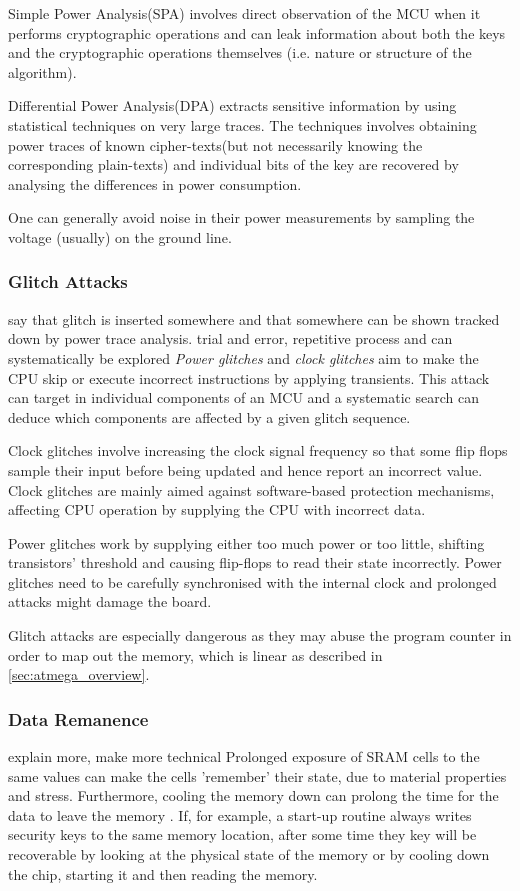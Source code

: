 	Simple Power Analysis(SPA) involves direct observation of the MCU when it performs cryptographic operations and can leak information about both the keys and the cryptographic operations themselves (i.e. nature or structure of the algorithm)\citep{kocher:DPA}\citep{anderson:tamper_resistance}. 

	Differential Power Analysis(DPA) extracts sensitive information by using statistical techniques on very large traces. The techniques involves obtaining power traces of known cipher-texts(but not necessarily knowing the corresponding plain-texts) and individual bits of the key are recovered by analysing the differences in power consumption\citep{kocher:DPA}\citep{anderson:tamper_resistance}.
	
	One can generally avoid noise in their power measurements by sampling the voltage (usually) on the ground line\citep{sergei:thesis}.
	\subsubsection{Glitch Attacks}
	{\color{red} say that glitch is inserted somewhere and that somewhere can be shown tracked down by power trace analysis. trial and error, repetitive process and can systematically be explored \citep{website:riscure}}
	\emph{Power glitches} and \emph{clock glitches} aim to make the CPU skip or execute incorrect instructions by applying transients. This attack can target in individual components of an MCU and a systematic search can deduce which components are affected by a given glitch sequence.
	
	Clock glitches involve increasing the clock signal frequency so that some flip flops sample their input before being updated and hence report an incorrect value. Clock glitches are mainly aimed against software-based protection mechanisms, affecting CPU operation by supplying the CPU with incorrect data.
	
	Power glitches work by supplying either too much power or too little, shifting transistors' threshold and causing flip-flops to read their state incorrectly. Power glitches need to be carefully synchronised with the internal clock and prolonged attacks might damage the board.
	
	Glitch attacks are especially dangerous as they may abuse the program counter in order to map out the memory, which is linear as described in \ref{sec:atmega_overview}.
	
	\subsubsection{Data Remanence}
	{\color{red} explain more, make more technical}
	Prolonged exposure of SRAM cells to the same values can make the cells 'remember' their state, due to material properties and stress\citep{gutman:memory_remanence}. Furthermore, cooling the memory down can prolong the time for the data to leave the memory \citep{gutman:memory_remanence}\citep{sergei:RAM}\citep{sergei:thesis}. If, for example, a start-up routine always writes security keys to the same memory location, after some time they key will be recoverable by looking at the physical state of the memory or by cooling down the chip, starting it and then reading the memory.
	
